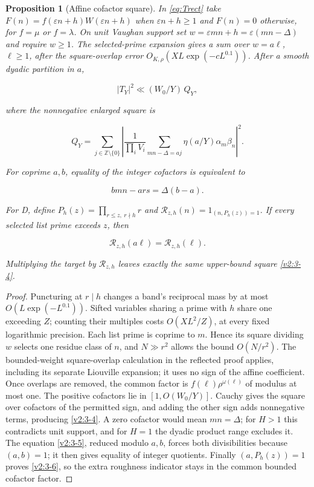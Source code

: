 \documentclass[11pt]{article}
\newtheorem{proposition}[theorem]{Proposition}
\theoremstyle{definition}
\theoremstyle{remark}
\numberwithin{equation}{section}
\begin{document}
\begin{proposition}[Affine cofactor square]\label{prop:affine-square}
In \eqref{eq:Trect} take $F(n)=f(\varepsilon n+h)W(\varepsilon n+h)$ when $\varepsilon n+h\ge1$ and $F(n)=0$ otherwise, for $f=\mu$ or $f=\lambda$. On unit Vaughan support set $w=\varepsilon mn+h=\varepsilon(mn-\Delta)$ and require $w\ge1$. The selected-prime expansion gives a sum over $w=a\ell$, $\ell\ge1$, after the square-overlap error $O_{K,\rho}(XL\exp(-cL^{0.1}))$. After a smooth dyadic partition in $a$,


\begin{equation}
|T_Y|^2\ll (W_0/Y)\,Q_Y,
\end{equation}


where the nonnegative enlarged square is


\begin{equation}\label{v2:3-4}
Q_Y=\sum_{j\in\mathbb Z\setminus\{0\}}
 \left|\frac1{\prod_iV_i}\sum_{mn-\Delta=aj}
 \eta(a/Y)\alpha_m\beta_n\right|^2.
\end{equation}


For coprime $a,b$, equality of the integer cofactors is equivalent to


\begin{equation}\label{v2:3-5}
bmn-ars=\Delta(b-a).
\end{equation}


For D, define $P_h(z)=\prod_{r\le z,\ r\nmid h}r$ and $\mathcal R_{z,h}(n)=1_{(n,P_h(z))=1}$. If every selected list prime exceeds $z$, then


\begin{equation}\label{v2:3-6}
\mathcal R_{z,h}(a\ell)=\mathcal R_{z,h}(\ell).
\end{equation}


Multiplying the target by $\mathcal R_{z,h}$ leaves exactly the same upper-bound square \eqref{v2:3-4}.

\end{proposition}\begin{proof} Puncturing at $r\mid h$ changes a band's reciprocal mass by at most $O(L\exp(-L^{0.1}))$. Sifted variables sharing a prime with $h$ share one exceeding $Z$; counting their multiples costs $O(XL^2/Z)$, at every fixed logarithmic precision. Each list prime is coprime to $m$. Hence its square dividing $w$ selects one residue class of $n$, and $N\gg r^2$ allows the bound $O(N/r^2)$. The bounded-weight square-overlap calculation in the reflected proof applies, including its separate Liouville expansion; it uses no sign of the affine coefficient. Once overlaps are removed, the common factor is $f(\ell)\rho^{\omega(\ell)}$ of modulus at most one. The positive cofactors lie in $[1,O(W_0/Y)]$. Cauchy gives the square over cofactors of the permitted sign, and adding the other sign adds nonnegative terms, producing \eqref{v2:3-4}. A zero cofactor would mean $mn=\Delta$; for $H>1$ this contradicts unit support, and for $H=1$ the dyadic product range excludes it. The equation \eqref{v2:3-5}, reduced modulo $a,b$, forces both divisibilities because $(a,b)=1$; it then gives equality of integer quotients. Finally $(a,P_h(z))=1$ proves \eqref{v2:3-6}, so the extra roughness indicator stays in the common bounded cofactor factor. \end{proof}
\end{document}

